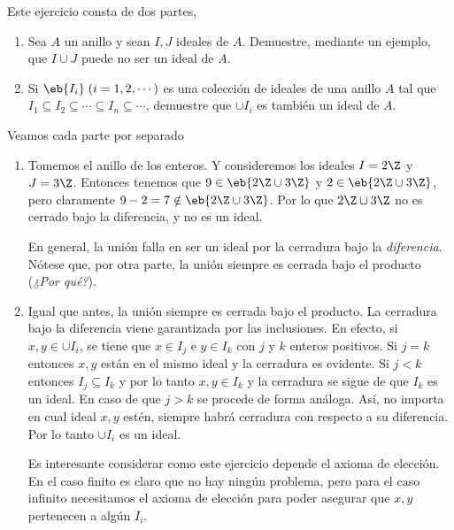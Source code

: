 \begin{ejer} Este ejercicio consta de dos partes,
	\begin{enumerate}
		\item Sea $A$ un anillo y sean $I,J$ ideales de $A$. Demuestre, mediante un ejemplo, que $I\cup J$ puede no ser un ideal de $A$.
		\item Si $\eb{I_i} \; (i = 1,2,\cdots)$ es una colección de ideales de una anillo $A$ tal que $I_1 \subseteq I_2 \subseteq \cdots \subseteq I_n \subseteq \cdots$, demuestre que $\cup I_i$ es también un ideal de $A$.
	\end{enumerate}
\end{ejer}
\begin{sol}
	Veamos cada parte por separado 
	\begin{enumerate}
		\item Tomemos el anillo de los enteros. Y consideremos los ideales $I = 2\Z$ y $J=3\Z$. Entonces tenemos que $9\in \eb{2\Z \cup 3\Z}$ y $2\in \eb{2\Z \cup 3\Z}$, pero claramente $9-2 = 7\notin \eb{2\Z \cup 3\Z}$. Por lo que $2\Z \cup 3\Z$ no es cerrado bajo la diferencia, y no es un ideal. 
		
		En general, la unión falla en ser un ideal por la cerradura bajo la \textit{diferencia}. Nótese que, por otra parte, la unión siempre es cerrada bajo el producto (\textit{¿Por qué?}).
		\item Igual que antes, la unión siempre es cerrada bajo el producto. La cerradura bajo la diferencia viene garantizada por las inclusiones. En efecto, si $x,y\in \cup I_i$, se tiene que $x\in I_j$ e $y\in I_k$ con $j$ y $k$ enteros positivos. Si $j=k$ entonces $x,y$ están en el mismo ideal y la cerradura es evidente. Si $j<k$ entonces $I_j \subseteq I_k$ y por lo tanto $x,y\in I_k$ y la cerradura se sigue de que $I_k$ es un ideal. En caso de que $j>k$ se procede de forma análoga. Así, no importa en cual ideal $x,y$ estén, siempre habrá cerradura con respecto a su diferencia. Por lo tanto $\cup I_i$ es un ideal. 
		
		Es interesante considerar como este ejercicio depende el axioma de elección\footnotemark. En el caso finito es claro que no hay ningún problema, pero para el caso infinito necesitamos el axioma de elección para poder asegurar que $x,y$ pertenecen a algún $I_i$.
	\end{enumerate}
\end{sol}
